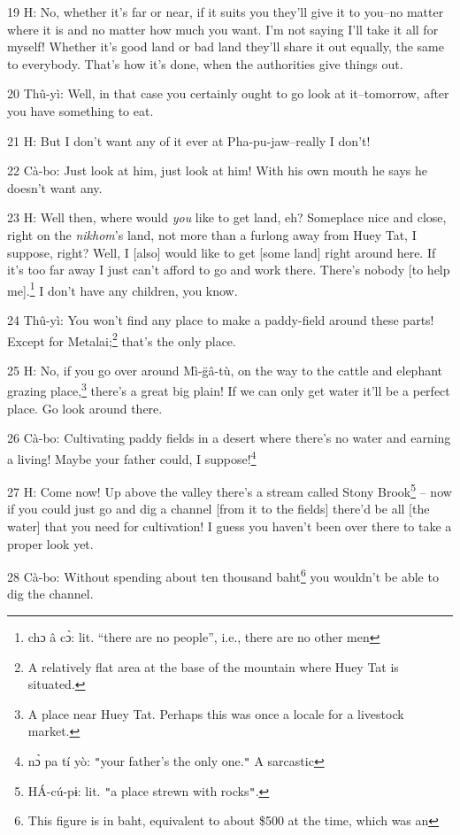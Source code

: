 19 H: No, whether it's far or near, if it suits you they'll give it to you--no
matter where it is and no matter how much you want. I'm not saying I'll take it
all for myself! Whether it's good land or bad land they'll share it out equally,
the same to everybody. That's how it's done, when the authorities give things out.

20 Thû-yì: Well, in that case you certainly ought to go look at it--tomorrow,
after you have something to eat.

21 H: But I don't want any of it ever at Pha-pu-jaw--really I don't!

22 Cà-bo: Just look at him, just look at him! With his own mouth he says he doesn't
want any.

23 H: Well then, where would \textit{you} like to get land, eh? Someplace nice
and close, right on the \textit{nikhom}'s land, not more than a furlong away from
Huey Tat, I suppose, right? Well, I [also] would like to get [some land] right
around here. If it's too far away I just can't afford to go and work there. There's
nobody [to help me].\footnote{chɔ â cɔ̀: lit. ``there are no people'', i.e., there are no other men} I don't have any children, you know.

24 Thû-yì: You won't find any place to make a paddy-field around these parts!
Except for Metalai;\footnote{A relatively flat area at the base of the mountain where Huey Tat is situated.} that's the only place.

25 H: No, if you go over around Mì-g̈â-tù, on the way to the cattle and elephant
grazing place,\footnote{A place near Huey Tat. Perhaps this was once a locale for a livestock market.} there's a great big plain! If we can only get water it'll be
a perfect place. Go look around there.

26 Cà-bo: Cultivating paddy fields in a desert where there's no water and earning
a living! Maybe your father could, I suppose!\footnote{nɔ̀ pa tí yò: \texttt{"}your father's the only one.\texttt{"} A sarcastic}

27 H: Come now! Up above the valley there's a stream called Stony Brook\footnote{HÁ-cú-pɨ: lit. \texttt{"}a place strewn with rocks\texttt{"}.} --
now if you could just go and dig a channel [from it to the fields] there'd be all
[the water] that you need for cultivation! I guess you haven't been over there
to take a proper look yet.

28 Cà-bo: Without spending about ten thousand baht\footnote{This figure is in baht, equivalent to about \$500 at the time, which was an} you wouldn't be able to
dig the channel.

